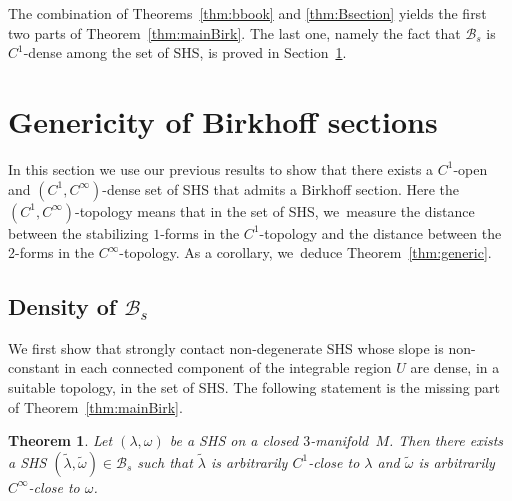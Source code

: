 \documentclass[10pt]{amsart}
\newcommand{\threemanifold}{$3$\nobreakdash-mani\-fold\xspace}
\newtheorem{theorem}{Theorem}[section]
\theoremstyle{definition}
\begin{document}
The combination of Theorems~\ref{thm:bbook} and \ref{thm:Bsection} yields the first two parts of Theorem~\ref{thm:mainBirk}. The last one, namely the fact that $\mathcal{B}_s$ is $C^1$-dense among the set of SHS, is proved in Section~\ref{sec:gen}.\enlargethispage{.5\baselineskip}%

\section{Genericity of Birkhoff sections}\label{sec:gen}

In this section we use our previous results to show that there exists a $C^1$-open and $(C^1,C^\infty)$-dense set of SHS that admits a Birkhoff section. Here the $(C^1,C^\infty)$-topology means that in the set of SHS, we~measure the distance between the stabilizing $1$-forms in the $C^1$-topology and the distance between the 2-forms in the $C^\infty$-topology. As a corollary, we~deduce Theorem~\ref{thm:generic}.

\subsection{Density of $\mathcal{B}_s$
}\label{ss:density}

We first show that strongly contact non-degenerate SHS whose slope is non-constant in each connected component of the integrable region $U$ are dense, in a suitable topology, in the set of SHS. The following statement is the missing part of Theorem~\ref{thm:mainBirk}.

\begin{theorem}\label{thm:density}
Let $(\lambda,\omega)$ be a SHS on a closed \threemanifold~$M$. Then there exists a SHS $(\widetilde \lambda, \widetilde \omega) \in \mathcal{B}_s$ such that $\widetilde \lambda$ is arbitrarily $C^1$-close to $\lambda$ and $\widetilde \omega$ is arbitrarily $C^\infty$-close to $\omega$.
\end{theorem}
\end{document}
